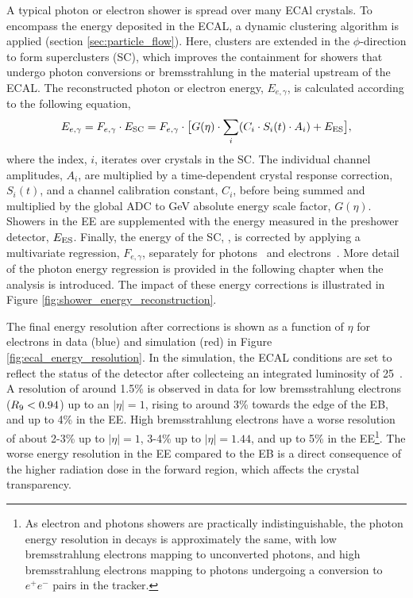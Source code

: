 A typical photon or electron shower is spread over many ECAl crystals. To encompass the energy deposited in the ECAL, a dynamic clustering algorithm is applied (section \ref{sec:particle_flow}). Here, clusters are extended in the $\phi$-direction to form superclusters (SC), which improves the containment for showers that undergo photon conversions or bremsstrahlung in the material upstream of the ECAL. The reconstructed photon or electron energy, $E_{e,\gamma}$, is calculated according to the following equation,
\begin{equation}
    E_{e,\gamma} = F_{e,\gamma} \cdot E_{\rm{SC}} = F_{e,\gamma} \cdot \big[ G(\eta) \cdot \sum_i (C_i \cdot S_i(t) \cdot A_i) + E_{\rm{ES}} \big],
\end{equation}
\noindent
where the index, $i$, iterates over crystals in the SC. The individual channel amplitudes, $A_i$, are multiplied by a time-dependent crystal response correction, $S_i(t)$, and a channel calibration constant, $C_i$, before being summed and multiplied by the global ADC to GeV absolute energy scale factor, $G(\eta)$. Showers in the EE are supplemented with the energy measured in the preshower detector, $E_{\rm{ES}}$. Finally, the energy of the SC, \Eraw, is corrected by applying a multivariate regression, $F_{e,\gamma}$, separately for photons~\cite{} and electrons~\cite{}. More detail of the photon energy regression is provided in the following chapter when the \Hgg analysis is introduced. The impact of these energy corrections is illustrated in Figure \ref{fig:shower_energy_reconstruction}.

The final energy resolution after corrections is shown as a function of $\eta$ for \Zee electrons in data (blue) and simulation (red) in Figure \ref{fig:ecal_energy_resolution}. In the simulation, the ECAL conditions are set to reflect the status of the detector after collecteing an integrated luminosity of 25~\fbinv. A resolution of around 1.5\% is observed in data for low bremsstrahlung electrons ($R_9<0.94$) up to an $|\eta|=1$, rising to around 3\% towards the edge of the EB, and up to 4\% in the EE. High bremsstrahlung electrons have a worse resolution of about 2-3\% up to $|\eta|=1$, 3-4\% up to $|\eta|=1.44$, and up to 5\% in the EE\footnote{As electron and photons showers are practically indistinguishable, the photon energy resolution in \Hgg decays is approximately the same, with low bremsstrahlung electrons mapping to unconverted photons, and high bremsstrahlung electrons mapping to photons undergoing a conversion to $e^+e^-$ pairs in the tracker.}. The worse energy resolution in the EE compared to the EB is a direct consequence of the higher radiation dose in the forward region, which affects the crystal transparency.

